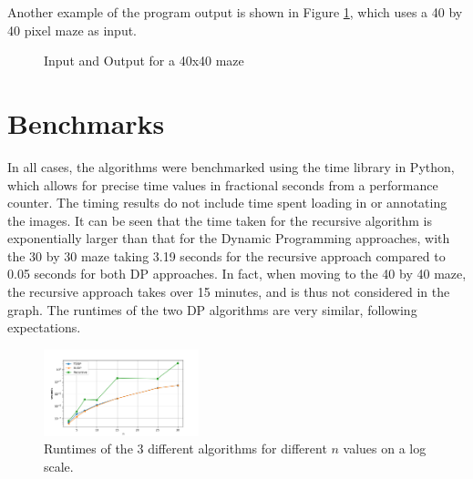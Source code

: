 \documentclass[11pt]{article}
\begin{document}
\begin{multicols}{2}
	Another example of the program output is shown in Figure \ref{fig:maze_big}, which uses a 40 by
	40 pixel maze as input.

	\begin{figure}[H]
		\centering
		\qquad
		\caption{Input and Output for a 40x40 maze\label{fig:maze_big}}
	\end{figure}

	\section{Benchmarks}
	In all cases, the algorithms were benchmarked using the time library in Python, which allows for
	precise time values in fractional seconds from a performance counter. The timing results do not
	include time spent loading in or annotating the images. It can be seen that the time taken for
	the recursive algorithm is exponentially larger than that for the Dynamic Programming
	approaches, with the 30 by 30 maze taking 3.19 seconds for the recursive approach compared to 0.05
	seconds for both DP approaches. In fact, when moving to the 40 by 40 maze, the recursive
	approach takes over 15 minutes, and is thus not considered in the graph. The runtimes of the two
	DP algorithms are very similar, following expectations.
	\begin{figure}[H]
		\centering
		\includegraphics[width=0.4\textwidth]{figures/benchmark_log.png}
		\caption{Runtimes of the 3 different algorithms for different ${n}$ values on a log
			scale.\label{fig:benchmark}}
	\end{figure}


\end{multicols}
\end{document}
